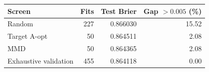 \begin{tabular}{lrrr}
\toprule
Screen & Fits & Test Brier & Gap $>0.005$ (\%)\\
\midrule
Random & 227 & 0.866030 & 15.52 \\
Target A-opt & 50 & 0.864511 & 2.08 \\
MMD & 50 & 0.864365 & 2.08 \\
Exhaustive validation & 455 & 0.864118 & 0.00 \\
\bottomrule
\end{tabular}

